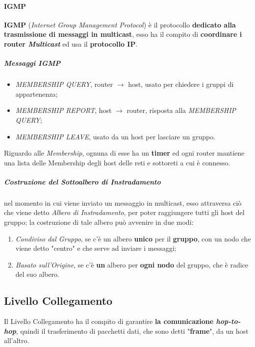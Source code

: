 \documentclass[a4paper]{article}
\begin{document}
			\paragraph{IGMP}
				\textbf{IGMP} (\emph{Internet Group Management Protocol}) è il protocollo \textbf{dedicato alla trasmissione di messaggi in multicast}, esso ha il compito di \textbf{coordinare i router \emph{Multicast}} ed usa il \textbf{protocollo IP}.
				
				\subparagraph{Messaggi IGMP}
					\begin{itemize}
						\item \emph{MEMBERSHIP QUERY}, router $ \rightarrow $ host, usato per chiedere i gruppi di appartenenza;
						\item \emph{MEMBERSHIP REPORT}, host $ \rightarrow $ router, risposta alla \emph{MEMBERSHIP QUERY};
						\item \emph{MEMBERSHIP LEAVE}, usato da un host per lasciare un gruppo.
					\end{itemize}
					
					Riguardo alle \emph{Membership}, ognuna di esse ha un \textbf{timer} ed ogni router mantiene una lista delle Membership degli host delle reti e sottoreti a cui è connesso.
					
				\subparagraph{Costruzione del Sottoalbero di Instradamento}
					nel momento in cui viene inviato un messaggio in multicast, esso attraversa ciò che viene detto \emph{Albero di Instradamento}, per poter raggiungere tutti gli host del gruppo; la costruzione di tale albero può avvenire in due modi:
					\begin{enumerate}
						\item \emph{Condiviso dal Gruppo}, se c'è un albero \textbf{unico} per il \textbf{gruppo}, con un nodo che viene detto "centro" e che serve ad inviare i messaggi;
						\item \emph{Basato sull'Origine}, se c'è \textbf{un} albero per \textbf{ogni nodo} del gruppo, che è radice del suo albero.
					\end{enumerate}
					
				\newpage
				
				
		\subsection{Livello Collegamento}
		
			Il Livello Collegamento ha il compito di garantire \textbf{la comunicazione \emph{hop-to-hop}}, quindi il trasferimento di pacchetti dati, che sono detti "\textbf{frame}", da un host all'altro.
			
\end{document}
